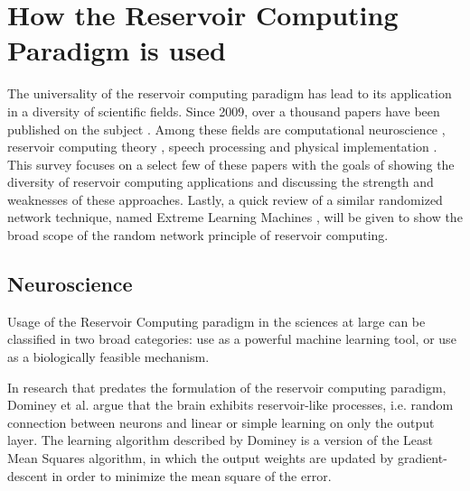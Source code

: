 \documentclass[12pt,oneside]{CUNY_CS_PhD}
\begin{document}
\chapter{How the Reservoir Computing Paradigm is used}
\label{lit}
The universality of the reservoir computing paradigm has lead to its application in a diversity of scientific fields. Since 2009, over a thousand papers have been published on the subject \cite{GS2014}. Among these fields are computational neuroscience \cite{buteneers2009real, bernacchia_reservoir_2011, hinaut_2012, hinaut_exploring_2014}, reservoir computing theory \cite{lukovsevivcius2012reservoir, hermans2012recurrent, chatzis2011echo, oubbati_multiobjective_2012}, speech processing \cite{triefenbach_phoneme_2010,JaDmMjp2013,JaTfDkMjp14} and physical implementation \cite{appeltant2011information, paquot2012optoelectronic, appeltant2014constructing}.
This survey focuses on a select few of these papers with the goals of showing the diversity of reservoir computing applications and discussing the strength and weaknesses of these approaches. 
Lastly, a quick review of a similar randomized network technique, named Extreme Learning Machines \cite{huang_extreme_2006,huang_extreme_2011}, will be given to show the broad scope of the random network principle of reservoir computing.


\section{Neuroscience}
Usage of the Reservoir Computing paradigm in the sciences at large can be classified in two broad categories: use as a powerful machine learning tool, or use as a biologically feasible mechanism. 

\label{dominey}
In research that predates the formulation of the reservoir computing paradigm, Dominey  et al. \cite{Dominey95, Domineyetal03} argue that the brain exhibits reservoir-like processes, i.e. random connection between neurons and linear or simple learning on only the output layer. The learning algorithm described by Dominey is a version of the Least Mean Squares algorithm, in which the output weights are updated by gradient-descent in order to minimize the mean square of the error.
\end{document}
